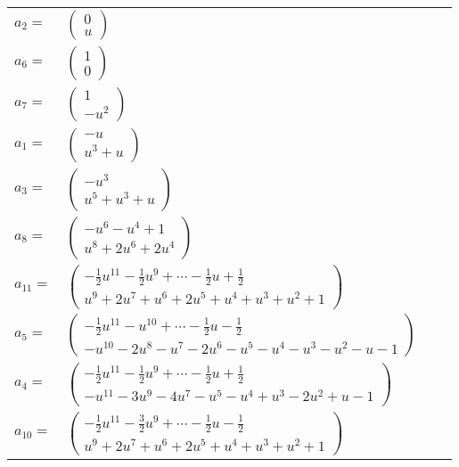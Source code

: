 \documentclass[1p]{elsarticle_modified}
\theoremstyle{definition}
\begin{document}
\begin{tabular}{m{7pt} m{180pt} m{7pt} m{180pt} }
\flushright $a_{2}=$&$\begin{pmatrix}0\\u\end{pmatrix}$ \\
\flushright $a_{6}=$&$\begin{pmatrix}1\\0\end{pmatrix}$ \\
\flushright $a_{7}=$&$\begin{pmatrix}1\\- u^2\end{pmatrix}$ \\
\flushright $a_{1}=$&$\begin{pmatrix}- u\\u^3+u\end{pmatrix}$ \\
\flushright $a_{3}=$&$\begin{pmatrix}- u^3\\u^5+u^3+u\end{pmatrix}$ \\
\flushright $a_{8}=$&$\begin{pmatrix}- u^6- u^4+1\\u^8+2 u^6+2 u^4\end{pmatrix}$ \\
\flushright $a_{11}=$&$\begin{pmatrix}-\frac{1}{2} u^{11}-\frac{1}{2} u^9+\cdots-\frac{1}{2} u+\frac{1}{2}\\u^9+2 u^7+u^6+2 u^5+u^4+u^3+u^2+1\end{pmatrix}$ \\
\flushright $a_{5}=$&$\begin{pmatrix}-\frac{1}{2} u^{11}- u^{10}+\cdots-\frac{1}{2} u-\frac{1}{2}\\- u^{10}-2 u^8- u^7-2 u^6- u^5- u^4- u^3- u^2- u-1\end{pmatrix}$ \\
\flushright $a_{4}=$&$\begin{pmatrix}-\frac{1}{2} u^{11}-\frac{1}{2} u^9+\cdots-\frac{1}{2} u+\frac{1}{2}\\- u^{11}-3 u^9-4 u^7- u^5- u^4+u^3-2 u^2+u-1\end{pmatrix}$ \\
\flushright $a_{10}=$&$\begin{pmatrix}-\frac{1}{2} u^{11}-\frac{3}{2} u^9+\cdots-\frac{1}{2} u-\frac{1}{2}\\u^9+2 u^7+u^6+2 u^5+u^4+u^3+u^2+1\end{pmatrix}$ \\

\end{tabular}
\end{document}

